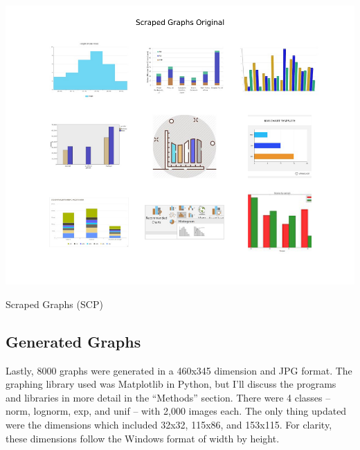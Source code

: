 \documentclass[12pt]{article}
\begin{document}
            \begin{table}[ht]
            
                \begin{center}

                    \includegraphics[scale=0.6]{scraped_overview_original.png}
                    \caption{Scraped Graphs (SCP) \cite{sunedition2021}}
                    \label{scraped-overview}
        
                \end{center}
                
            \end{table}

            

        \subsection{Generated Graphs}
        
            Lastly, 8000 graphs were generated in a 460x345 dimension and JPG format. 
            The graphing library used was Matplotlib in Python, 
            but I’ll discuss the programs and libraries in more detail in the “Methods” section. 
            There were 4 classes -- norm, lognorm, exp, and unif -- with 2,000 images each. 
            The only thing updated were the dimensions which included 32x32, 115x86, and 153x115. 
            For clarity, these dimensions follow the Windows format of width by height.
\end{document}
